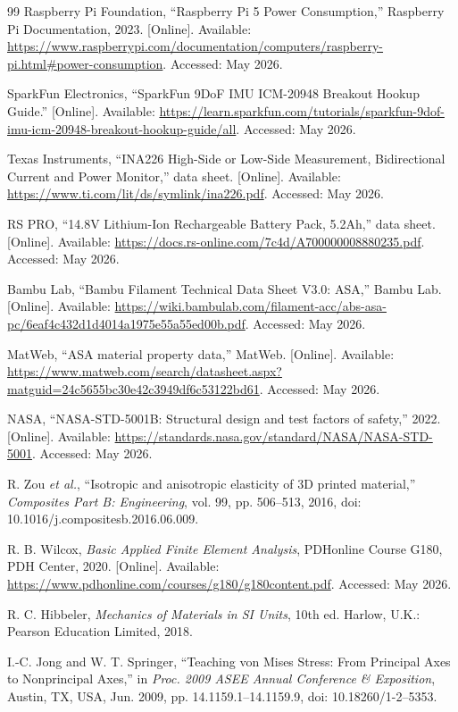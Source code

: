 \begin{thebibliography}{99}
Raspberry Pi Foundation, ``Raspberry Pi 5 Power Consumption,'' Raspberry Pi Documentation, 2023. [Online]. Available: \url{https://www.raspberrypi.com/documentation/computers/raspberry-pi.html#power-consumption}. Accessed: May 2026.

SparkFun Electronics, ``SparkFun 9DoF IMU ICM-20948 Breakout Hookup Guide.'' [Online]. Available: \url{https://learn.sparkfun.com/tutorials/sparkfun-9dof-imu-icm-20948-breakout-hookup-guide/all}. Accessed: May 2026.

Texas Instruments, ``INA226 High-Side or Low-Side Measurement, Bidirectional Current and Power Monitor,'' data sheet. [Online]. Available: \url{https://www.ti.com/lit/ds/symlink/ina226.pdf}. Accessed: May 2026.

RS PRO, ``14.8V Lithium-Ion Rechargeable Battery Pack, 5.2Ah,'' data sheet. [Online]. Available: \url{https://docs.rs-online.com/7c4d/A700000008880235.pdf}. Accessed: May 2026.

Bambu Lab, ``Bambu Filament Technical Data Sheet V3.0: ASA,'' Bambu Lab. [Online]. Available: \url{https://wiki.bambulab.com/filament-acc/abs-asa-pc/6eaf4c432d1d4014a1975e55a55ed00b.pdf}. Accessed: May 2026.

MatWeb, ``ASA material property data,'' MatWeb. [Online]. Available: \url{https://www.matweb.com/search/datasheet.aspx?matguid=24c5655bc30e42c3949df6c53122bd61}. Accessed: May 2026.

NASA, ``NASA-STD-5001B: Structural design and test factors of safety,'' 2022. [Online]. Available: \url{https://standards.nasa.gov/standard/NASA/NASA-STD-5001}. Accessed: May 2026.

R. Zou \textit{et al.}, ``Isotropic and anisotropic elasticity of 3D printed material,'' \textit{Composites Part B: Engineering}, vol. 99, pp. 506--513, 2016, doi: 10.1016/j.compositesb.2016.06.009.

R. B. Wilcox, \textit{Basic Applied Finite Element Analysis}, PDHonline Course G180, PDH Center, 2020. [Online]. Available: \url{https://www.pdhonline.com/courses/g180/g180content.pdf}. Accessed: May 2026.

R. C. Hibbeler, \textit{Mechanics of Materials in SI Units}, 10th ed. Harlow, U.K.: Pearson Education Limited, 2018.

I.-C. Jong and W. T. Springer, ``Teaching von Mises Stress: From Principal Axes to Nonprincipal Axes,'' in \textit{Proc. 2009 ASEE Annual Conference \& Exposition}, Austin, TX, USA, Jun. 2009, pp. 14.1159.1--14.1159.9, doi: 10.18260/1-2--5353.


\end{thebibliography}
